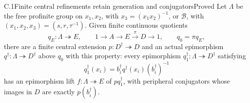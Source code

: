 \begin{statement}{C.1}{Finite central refinements retain generation and conjugators}{Proved}
Let \(\Lambda\) be the free profinite group on \(x_1,x_2\), with
\(x_3=(x_1x_2)^{-1}\), or \(\mathcal B\), with
\((x_1,x_2,x_3)=(s,r,\tau^{-1})\).
Given finite continuous quotients
\[
 q_E:\Lambda\twoheadrightarrow E,\qquad
 1\to A\to E\xrightarrow{\pi}D\to1,\qquad q_0=\pi q_E,
\]
there are a finite central extension \(p:D^\dagger\twoheadrightarrow D\)
and an actual epimorphism \(q^\dagger:\Lambda\twoheadrightarrow D^\dagger\)
above \(q_0\) with this property: every epimorphism
\(q_1^\dagger:\Lambda\twoheadrightarrow D^\dagger\) satisfying
\[
 q_1^\dagger(x_i)=b_i^\dagger q^\dagger(x_i)(b_i^\dagger)^{-1}
\]
has an epimorphism lift \(f:\Lambda\twoheadrightarrow E\) of
\(pq_1^\dagger\), with peripheral conjugators whose images in \(D\)
are exactly \(p(b_i^\dagger)\).
\end{statement}

